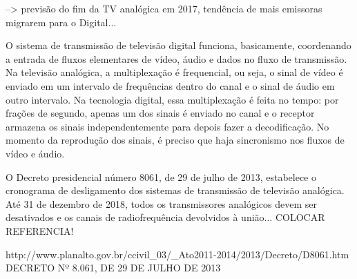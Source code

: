 \documentclass[
	12pt,				%
	openright,			%
	twoside,			%
	a4paper,			%
	english,			%
	french,				%
	brazil				%
	]{abntex2}
\begin{document}
 --> previsão do fim da TV analógica em 2017, tendência de mais emissoras migrarem para o Digital...
 
O sistema de transmissão de televisão digital funciona, basicamente, coordenando a entrada de fluxos elementares de
vídeo, áudio e dados no fluxo de transmissão. Na televisão analógica, a multiplexação é frequencial, ou seja, o sinal
de vídeo é enviado em um intervalo de frequências dentro do canal e o sinal de áudio em outro intervalo. Na tecnologia
digital, essa multiplexação é feita no tempo: por frações de segundo, apenas um dos sinais é enviado no canal e o
receptor armazena os sinais independentemente para depois fazer a decodificação. No momento da reprodução dos
sinais, é preciso que haja sincronismo nos fluxos de vídeo e áudio.

O Decreto presidencial número 8061, de 29 de julho de 2013, estabelece o cronograma de desligamento dos sistemas
de transmissão de televisão analógica. Até 31 de dezembro de 2018, todos os transmissores analógicos devem ser desativados
e os canais de radiofrequência devolvidos à união... COLOCAR REFERENCIA! 

http://www.planalto.gov.br/ccivil_03/_Ato2011-2014/2013/Decreto/D8061.htm
DECRETO Nº 8.061, DE 29 DE JULHO DE 2013

\end{document}
